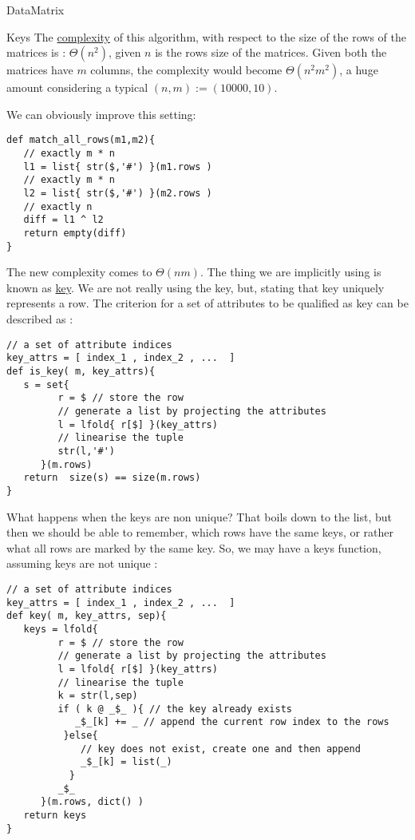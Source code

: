 \begin{section}{DataMatrix}
\begin{subsection}{Keys}
The \href{https://en.wikipedia.org/wiki/Computational\_complexity\_theory}{complexity} of this algorithm, 
with respect to the size of the rows of the matrices is : $\Theta(n^2)$, given $n$ is the rows size of the matrices. 
Given both the matrices have $m$ columns, the complexity would become $\Theta(n^2m^2)$, a huge amount considering
a typical $(n,m) := ( 10000, 10 ) $. 

We can obviously improve this setting: 

\begin{lstlisting}[style=JexlStyle]
def match_all_rows(m1,m2){
   // exactly m * n 
   l1 = list{ str($,'#') }(m1.rows )
   // exactly m * n
   l2 = list{ str($,'#') }(m2.rows )
   // exactly n
   diff = l1 ^ l2
   return empty(diff)  
}
\end{lstlisting}

The new complexity comes to $\Theta(nm)$.
The thing we are implicitly using is known as \href{https://en.wikipedia.org/wiki/Unique\_key}{key}.
We are not really using the key, but, stating that key uniquely represents a row. The criterion 
for a set of attributes to be qualified as key can be described as : 

\begin{lstlisting}[style=JexlStyle]
// a set of attribute indices 
key_attrs = [ index_1 , index_2 , ...  ]
def is_key( m, key_attrs){
   s = set{  
         r = $ // store the row
         // generate a list by projecting the attributes 
         l = lfold{ r[$] }(key_attrs)
         // linearise the tuple 
         str(l,'#')   
      }(m.rows)
   return  size(s) == size(m.rows)
}
\end{lstlisting}

What happens when the keys are non unique? That boils down to the list, 
but then we should be able to remember, which rows have the same keys,
or rather what all rows are marked by the same key.
So, we may have a keys function, assuming keys are not unique : 

\begin{lstlisting}[style=JexlStyle]
// a set of attribute indices 
key_attrs = [ index_1 , index_2 , ...  ]
def key( m, key_attrs, sep){
   keys = lfold{  
         r = $ // store the row
         // generate a list by projecting the attributes 
         l = lfold{ r[$] }(key_attrs)
         // linearise the tuple 
         k = str(l,sep)
         if ( k @ _$_ ){ // the key already exists 
            _$_[k] += _ // append the current row index to the rows
          }else{
             // key does not exist, create one and then append 
             _$_[k] = list(_) 
           }
         _$_    
      }(m.rows, dict() )
   return keys
}
\end{lstlisting}


\end{subsection}
\end{section}
